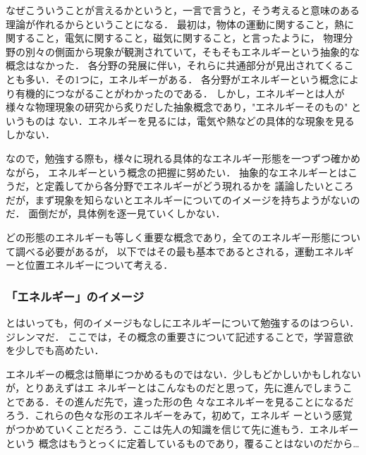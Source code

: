                 なぜこういうことが言えるかというと，一言で言うと，そう考えると意味のある理論が作れるからということになる．
                最初は，物体の運動に関すること，熱に関すること，電気に関すること，磁気に関すること，と言ったように，
                物理分野の別々の側面から現象が観測されていて，そもそもエネルギーという抽象的な概念はなかった．
                各分野の発展に伴い，それらに共通部分が見出されてくることも多い．その1つに，エネルギーがある．
                各分野がエネルギーという概念により有機的につながることがわかったのである．
                しかし，エネルギーとは人が様々な物理現象の研究から炙りだした抽象概念であり，"エネルギーそのもの" というものは
                ない．エネルギーを見るには，電気や熱などの具体的な現象を見るしかない．

                なので，勉強する際も，様々に現れる具体的なエネルギー形態を一つずつ確かめながら，
                エネルギーという概念の把握に努めたい．
                抽象的なエネルギーとはこうだ，と定義してから各分野でエネルギーがどう現れるかを
                議論したいところだが，まず現象を知らないとエネルギーについてのイメージを持ちようがないのだ．
                面倒だが，具体例を逐一見ていくしかない．

                どの形態のエネルギーも等しく重要な概念であり，全てのエネルギー形態について調べる必要があるが，
                以下ではその最も基本であるとされる，運動エネルギーと位置エネルギーについて考える．

            \subsubsection{「エネルギー」のイメージ}
                                とはいっても，何のイメージもなしにエネルギーについて勉強するのはつらい．ジレンマだ．
                                ここでは，その概念の重要さについて記述することで，学習意欲を少しでも高めたい．

                エネルギーの概念は簡単につかめるものではない．少しもどかしいかもしれないが，とりあえずはエ
                ネルギーとはこんなものだと思って，先に進んでしまうことである．その進んだ先で，違った形の色
                々なエネルギーを見ることになるだろう．これらの色々な形のエネルギーをみて，初めて，エネルギ
                ーという感覚がつかめていくことだろう．ここは先人の知識を信じて先に進もう．エネルギーという
                概念はもうとっくに定着しているものであり，覆ることはないのだから…

